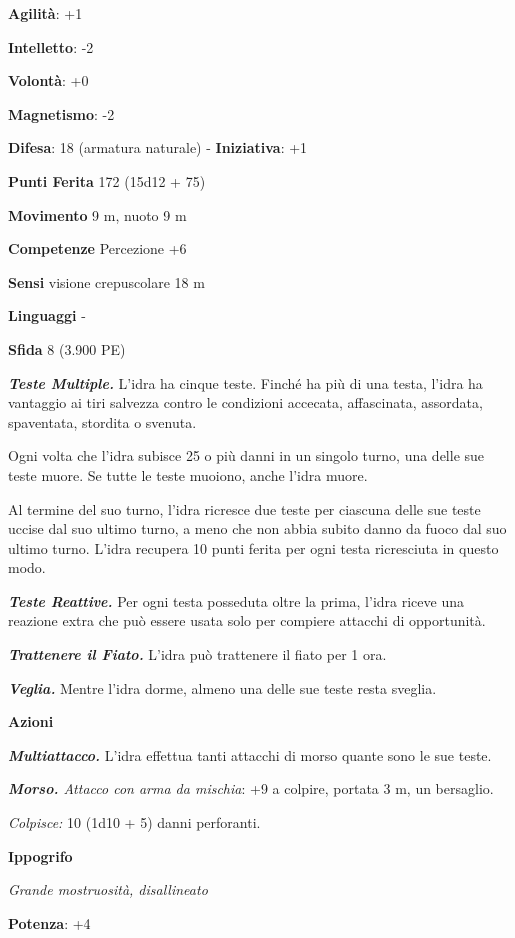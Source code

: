 \begin{multicols}{2}
\textbf{Agilità}: +1

\textbf{Intelletto}: -2

\textbf{Volontà}: +0

\textbf{Magnetismo}: -2

\textbf{Difesa}: 18 (armatura naturale) - \textbf{Iniziativa}: +1

\textbf{Punti Ferita} 172 (15d12 + 75)

\textbf{Movimento} 9 m, nuoto 9 m

\textbf{Competenze} Percezione +6

\textbf{Sensi} visione crepuscolare 18 m

\textbf{Linguaggi} -

\textbf{Sfida} 8 (3.900 PE)

\emph{\textbf{Teste Multiple.}} L'idra ha cinque teste. Finché ha più di
una testa, l'idra ha vantaggio ai tiri salvezza contro le condizioni
accecata, affascinata, assordata, spaventata, stordita o svenuta.

Ogni volta che l'idra subisce 25 o più danni in un singolo turno, una
delle sue teste muore. Se tutte le teste muoiono, anche l'idra muore.

Al termine del suo turno, l'idra ricresce due teste per ciascuna delle
sue teste uccise dal suo ultimo turno, a meno che non abbia subito danno
da fuoco dal suo ultimo turno. L'idra recupera 10 punti ferita per ogni
testa ricresciuta in questo modo.

\emph{\textbf{Teste Reattive.}} Per ogni testa posseduta oltre la prima,
l'idra riceve una reazione extra che può essere usata solo per compiere
attacchi di opportunità.

\emph{\textbf{Trattenere il Fiato.}} L'idra può trattenere il fiato per
1 ora.

\emph{\textbf{Veglia.}} Mentre l'idra dorme, almeno una delle sue teste
resta sveglia.

\textbf{Azioni}

\emph{\textbf{Multiattacco.}} L'idra effettua tanti attacchi di morso
quante sono le sue teste.

\emph{\textbf{Morso.} Attacco con arma da mischia}: +9 a colpire,
portata 3 m, un bersaglio.

\emph{Colpisce:} 10 (1d10 + 5) danni perforanti.

\textbf{Ippogrifo}

\emph{Grande mostruosità, disallineato}

\textbf{Potenza}: +4


\end{multicols}
